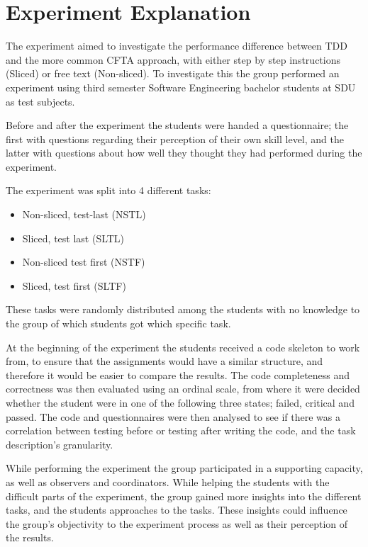\documentclass{sig-alternate-05-2015}
\begin{document}
\section{Experiment Explanation}
The experiment aimed to investigate the performance difference between TDD and the more common CFTA approach, with either step by step instructions (Sliced) or free text (Non-sliced). To investigate this the group performed an experiment using third semester Software Engineering bachelor students at SDU as test subjects.


Before and after the experiment the students were handed a questionnaire; the first with questions regarding their perception of their own skill level, and the latter with questions about how well they thought they had performed during the experiment.


The experiment was split into 4 different tasks:
\begin{itemize}
	\item Non-sliced, test-last (NSTL)
	\item Sliced, test last (SLTL)
	\item Non-sliced test first (NSTF)
	\item Sliced, test first (SLTF)
\end{itemize}

These tasks were randomly distributed among the students with no knowledge to the group of which students got which specific task.


At the beginning of the experiment the students received a code skeleton to work from, to ensure that the assignments would have a similar structure, and therefore it would be easier to compare the results. The code completeness and correctness was then evaluated using an ordinal scale, from where it were decided whether the student were in one of the following three states; failed, critical and passed. The code and questionnaires were then analysed to see if there was a correlation between testing before or testing after writing the code, and the task description's granularity.


While performing the experiment the group participated in a supporting capacity, as well as observers and coordinators. While helping the students with the difficult parts of the experiment, the group gained more insights into the different tasks, and the students approaches to the tasks. These insights could influence the group's objectivity to the experiment process as well as their perception of the results.
\end{document}
